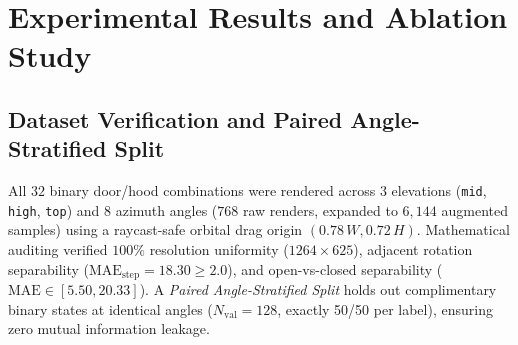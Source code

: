 \documentclass[journal]{IEEEtran}
\begin{document}
\section{Experimental Results and Ablation Study}
\subsection{Dataset Verification and Paired Angle-Stratified Split}
All $32$ binary door/hood combinations were rendered across $3$ elevations (\texttt{mid}, \texttt{high}, \texttt{top}) and $8$ azimuth angles ($768$ raw renders, expanded to $6,144$ augmented samples) using a raycast-safe orbital drag origin $(0.78\,W, 0.72\,H)$. Mathematical auditing verified $100\%$ resolution uniformity ($1264 \times 625$), adjacent rotation separability ($\text{MAE}_{\text{step}} = 18.30 \ge 2.0$), and open-vs-closed separability ($\text{MAE} \in [5.50, 20.33]$). A \emph{Paired Angle-Stratified Split} holds out complimentary binary states at identical angles ($N_{\text{val}} = 128$, exactly 50/50 per label), ensuring zero mutual information leakage.

\begin{table}[htbp]
\centering
\caption{Architectural ablation study of Multi-Scale PA-SCAN on the paired angle-stratified validation set ($N=128$).}
\label{tab:ablation_study}
\end{table}
\end{document}
